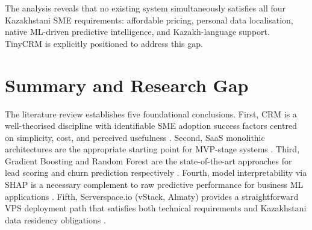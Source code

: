 The analysis reveals that no existing system simultaneously satisfies all
four Kazakhstani SME requirements: affordable pricing, personal data
localisation, native ML-driven predictive intelligence, and Kazakh-language
support. TinyCRM is explicitly positioned to address this gap.

\section{Summary and Research Gap}

The literature review establishes five foundational conclusions. First, CRM
is a well-theorised discipline with identifiable SME adoption success
factors centred on simplicity, cost, and perceived usefulness
\citep{nguyen2013}. Second, SaaS monolithic architectures are the
appropriate starting point for MVP-stage systems \citep{richardson2018,
fowler2014microservices}. Third, Gradient Boosting and Random Forest are
the state-of-the-art approaches for lead scoring and churn prediction
respectively \citep{verbeke2012, chen2016xgboost}. Fourth, model
interpretability via SHAP is a necessary complement to raw predictive
performance for business ML applications \citep{lundberg2017shap}. Fifth,
Serverspace.io (vStack, Almaty) provides a straightforward VPS deployment
path that satisfies both technical requirements and Kazakhstani data
residency obligations \citep{serverspacedocs2025,kazakhstanlaw94v}.
